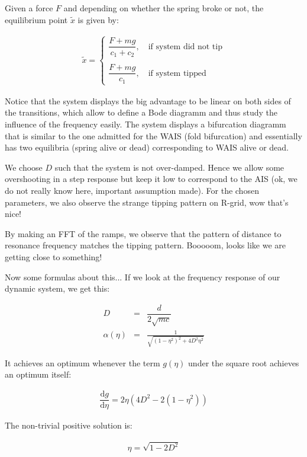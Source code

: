 \documentclass[a4paper,10pt]{report}
\numberwithin{equation}{section}
\begin{document}
Given a force $F$ and depending on whether the spring broke or not, the equilibrium point $\tilde{x}$ is given by:

\begin{eqnarray}
\tilde{x} = \left\lbrace \begin{array}{l}
\dfrac{F + mg}{c_{1} + c_{2}}, \quad \text{if system did not tip} \\
\ \\
\dfrac{F + mg}{c_{1}} , \quad \text{if system tipped}
\end{array}  \right.
\end{eqnarray}

Notice that the system displays the big advantage to be linear on both sides of the transitions, which allow to define a Bode diagramm and thus study the influence of the frequency easily. The system displays a bifurcation diagramm that is similar to the one admitted for the WAIS (fold bifurcation) and essentially has two equilibria (spring alive or dead) corresponding to WAIS alive or dead.

We choose $D$ such that the system is not over-damped. Hence we allow some overshooting in a step response but keep it low to correspond to the AIS (ok, we do not really know here, important assumption made). For the chosen parameters, we also observe the strange tipping pattern on R-grid, wow that's nice!

By making an FFT of the ramps, we observe that the pattern of distance to resonance frequency matches the tipping pattern. Booooom, looks like we are getting close to something!

Now some formulas about this... If we look at the frequency response of our dynamic system, we get this:

\begin{eqnarray}
D &=& \dfrac{d}{2 \sqrt{mc}} \\
\alpha(\eta)&=&\frac{1}{\sqrt{\left(1-\eta^{2}\right)^{2}+4 D^{2} \eta^{2}}}
\end{eqnarray}

It achieves an optimum whenever the term $g(\eta)$ under the square root achieves an optimum itself:

\begin{eqnarray}
\dfrac{\mathrm{d}g}{\mathrm{d}\eta} = 2 \eta (4  D^{2} - 2 (1-\eta^2))
\end{eqnarray}

The non-trivial positive solution is:

\begin{eqnarray}
\eta = \sqrt{1-2 D^2}
\end{eqnarray}
\end{document}
